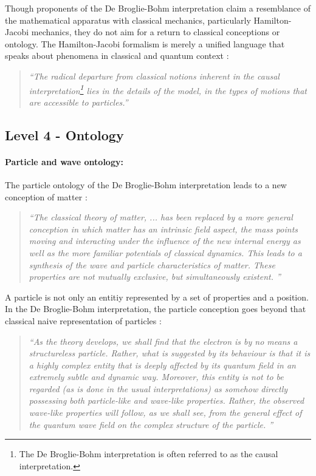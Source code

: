 \documentclass{article}
\begin{document}
Though proponents of the De Broglie-Bohm interpretation claim a resemblance of the mathematical apparatus with classical mechanics, particularly Hamilton-Jacobi mechanics, they do not aim for a return to classical conceptions or ontology. The Hamilton-Jacobi formalism is merely a unified language that speaks about phenomena in classical and quantum context \cite[p.78]{holland1995quantum}:

\begin{quote}
\textit{``The radical departure from classical notions inherent in the causal interpretation\footnote{The De Broglie-Bohm interpretation is often referred to as the causal interpretation.} lies in the details of the model, in the types of motions that are accessible to particles.''}
\end{quote}

\newpage

\subsection*{Level 4 - Ontology}

\paragraph{Particle and wave ontology:}

The particle ontology of the De Broglie-Bohm interpretation leads to a new conception of matter \cite[p.65]{holland1995quantum}:

\begin{quote}
\textit{``The classical theory of matter, ... has been replaced by a more general conception in which matter has an intrinsic field aspect, the mass points moving and interacting under the influence of the new internal energy as well as the more familiar potentials of classical dynamics.
This leads to a synthesis of the wave and particle characteristics of matter. These properties are not mutually exclusive, but simultaneously existent. ''}
\end{quote}

A particle is not only an entitiy represented by a set of properties and a position. In the De Broglie-Bohm interpretation, the particle conception goes beyond that classical naive representation of particles \cite[]{bohm1987ontological}:

\begin{quote}
\textit{``As the theory develops, we shall find that the electron is by no means a structureless particle. Rather, what is suggested by its behaviour is that it is a highly complex entity that is deeply affected by its quantum field in an extremely subtle and dynamic way. Moreover, this entity is not to be regarded (as is done in the usual interpretations) as somehow directly possessing both particle-like and wave-like properties. Rather, the observed wave-like properties will follow, as we shall see, from the general effect of the quantum wave field on the complex structure of the particle. ''}
\end{quote}
\end{document}
